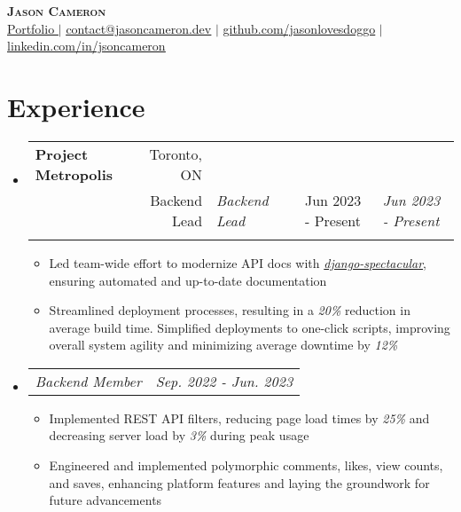 \documentclass[letterpaper,11pt]{article}
\makeatletter
\newcommand{\resumeItem}[1]{
    \item\small{
            {#1 \vspace{-2pt}}
    }
}
\newcommand{\resumeSubheading}[4]{%
    \vspace{-2pt}\item
    \begin{tabular*}{0.97\textwidth}[t]{@{}l@{\extracolsep{\fill}}r@{}}
        \textbf{#1} & #2 \\
        \ifx & #3 &%
        \else
        \textit{\small#3} &
        \fi
        \ifx & #4 &%
        \else
        \textit{\small #4} \\
        \fi
    \end{tabular*}\vspace{-7pt}%
}
\newcommand{\resumeSubSubheading}[2]{
    \item
    \begin{tabular*}{0.97\textwidth}{l@{\extracolsep{\fill}}r}
        \textit{\small#1} & \textit{\small #2} \\
    \end{tabular*}\vspace{-7pt}
}
\newcommand{\resumeSubHeadingListStart}{\begin{itemize}[leftmargin=0.15in, label={}]}
\newcommand{\resumeSubHeadingListEnd}{\end{itemize}}
\newcommand{\resumeItemListStart}{\begin{itemize}}
\newcommand{\resumeItemListEnd}{\end{itemize}\vspace{-5pt}}
\makeatother
\begin{document}
\begin{center}
\textbf{\Huge \scshape Jason Cameron} \\ \vspace{1pt}
\underline{\href{https://jasoncameron.dev}{\raisebox{-0.05\height}{\faDesktop} Portfolio $|$}}
\underline{\href{mailto:contact@jasoncameron.dev}{\raisebox{-0.05\height}{\faEnvelope} contact@jasoncameron.dev}} $|$
\underline{\href{https://github.com/jasonlovesdoggo}{\raisebox{-0.05\height}{\faGithub} github.com/jasonlovesdoggo}} $|$
\underline{\href{https://www.linkedin.com/in/jsoncameron/}{\raisebox{-0.05\height}{\faLinkedin} linkedin.com/in/jsoncameron}}
\end{center}

\section{Experience}
\resumeSubHeadingListStart
\resumeSubheading
{Project Metropolis}{Toronto, ON}
{Backend Lead}{Jun 2023 - Present}

\resumeItemListStart
\resumeItem{
Led team-wide effort to modernize API docs with \emph{\href{https://github.com/tfranzel/drf-spectacular}{django-spectacular}}, ensuring automated and up-to-date documentation}
\resumeItem{
Streamlined deployment processes, resulting in a \emph{20\%} reduction in average build time. Simplified deployments to one-click scripts, improving overall system agility and minimizing average downtime by \emph{12\%}
}
\resumeSubHeadingListEnd
\resumeSubSubheading
{Backend Member}{Sep. 2022 - Jun. 2023}
\resumeItemListStart
\resumeItem{
Implemented REST API filters, reducing page load times by \emph{25\%} and decreasing server load by \emph{3\%} during peak usage}  %
\resumeItem{Engineered and implemented polymorphic comments, likes, view counts, and saves, enhancing platform features and laying the groundwork for future advancements}
\resumeItemListEnd
\resumeSubHeadingListEnd
\end{document}
